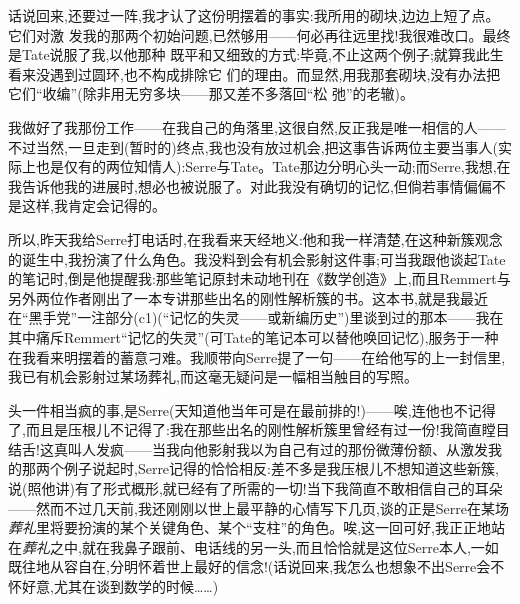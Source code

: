 \pmark{}话说回来,还要过一阵,我才认了这份明摆着的事实:我所用的砌块,边边上短了点。它们对激
发我的那两个初始问题,已然够用——何必再往远里找!我很难改口。最终是Tate说服了我,以他那种
既平和又细致的方式:毕竟,不止这两个例子;就算我此生看来没遇到过圆环,也不构成排除它
们的理由。而显然,用我那套砌块,没有办法把它们“收编”(除非用无穷多块——那又差不多落回“松
弛”的老辙)。

我做好了我那份工作——在我自己的角落里,这很自然,反正我是唯一相信的人——不过当然,一旦走到(暂时的)终点,我也没有放过机会,把这事告诉两位主要当事人\dmark{}(实际上也是仅有的两位知情人):Serre与Tate。Tate那边分明心头一动;而Serre,我想,在我告诉他我的进展时,想必也被说服了。对此我没有确切的记忆,但倘若事情偏偏不是这样,我肯定会记得的。

\pmark 所以,昨天我给Serre打电话时,在我看来天经地义:他和我一样清楚,在这种新簇观念的诞生中,我扮演了什么角色。我没料到会有机会影射这件事;可当我跟他谈起Tate的笔记时,倒是他提醒我:那些笔记原封未动地刊在《数学创造》上,而且Remmert与另外两位作者刚出了一本专讲那些出名的刚性解析簇的书。这本书,就是我最近在“黑手党”一注部分(c1)(“记忆的失灵——或新编历史”)里谈到过的那本——我在其中痛斥Remmert“记忆的失灵”(可Tate的笔记本可以替他唤回记忆),服务于一种在我看来明摆着的蓄意刁难。我顺带向Serre提了一句——在给他写的上一封信里,我已有机会影射过某场葬礼,而这毫无疑问是一幅相当触目的写照。

头一件相当疯的事,是Serre(天知道他当年可是在最前排的!)——唉,连他也不记得了,而且是压根儿不记得了:我在那些出名的刚性解析簇里曾经有过一份!我简直瞠目结舌!这真叫人发疯——当我向他影射我以为自己有过的那份微薄份额、从激发我的那两个例子说起时,Serre记得的恰恰相反:差不多是我压根儿不想知道这些新簇,说(照他讲)有了形式概形,就已经有了所需的一切\dmark{}!当下我简直不敢相信自己的耳朵——然而不过几天前,我还刚刚以世上最平静的心情写下几页,谈的正是Serre在某场\emph{葬礼}里将要扮演的某个关键角色、某个“支柱”的角色。唉,这一回可好,我正正地站在\emph{葬礼}之中,就在我鼻子跟前、电话线的另一头,而且恰恰就是这位Serre本人,一如既往地从容自在,分明怀着世上最好的信念!(话说回来,我怎么也想象不出Serre会不怀好意,尤其在谈到数学的时候……)


